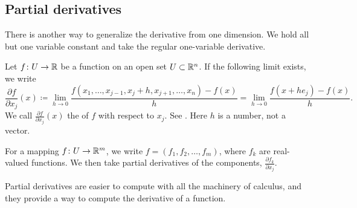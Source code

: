 \subsection{Partial derivatives}

There is another way to generalize the derivative from one dimension.
We hold all but one variable constant and take the regular
one-variable derivative.

\begin{defn}
Let
$f \colon U \to {\mathbb{R}}$ be a function on an open set $U \subset {\mathbb{R}}^n$.
If the following limit exists, we write
\begin{equation*}
\frac{\partial f}{\partial x_j} (x) \coloneqq 
\lim_{h\to 0}\frac{f(x_1,\ldots,x_{j-1},x_j+h,x_{j+1},\ldots,x_n)-f(x)}{h}
=
\lim_{h\to 0}\frac{f(x+h e_j)-f(x)}{h} .
\end{equation*}
We call 
$\frac{\partial f}{\partial x_j} (x)$ the \emph{}
of $f$
with respect to $x_j$.  %
See .
Here $h$ is a number, not a vector.

For a mapping $f \colon U \to {\mathbb{R}}^m$, we write
$f = (f_1,f_2,\ldots,f_m)$, where $f_k$ are real-valued
functions.  We then take partial derivatives of
the components,
$\frac{\partial f_k}{\partial x_j}$.
\end{defn}

\begin{myfigureht}
\caption{Illustration of a partial derivative for a function $f \colon \R^2
\to \R$.  The $yx_2$-plane where $x_1$ is fixed is marked in dotted line,
and the slope of the tangent line in the $yx_2$-plane is
$\frac{\partial f}{\partial x_2}(x_1,x_2)$.\label{fig:svpartder}}
\end{myfigureht}

Partial derivatives are easier to compute with all the machinery of
calculus, and they provide a way to compute the derivative of a
function.

